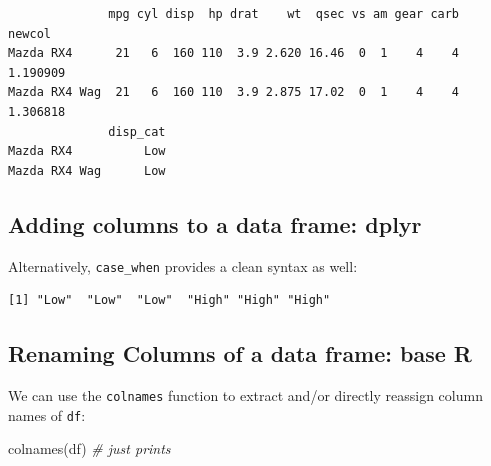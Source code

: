 \documentclass[
]{article}
\newenvironment{Shaded}{\begin{snugshade}}{\end{snugshade}}
\newcommand{\AttributeTok}[1]{\textcolor[rgb]{0.77,0.63,0.00}{#1}}
\newcommand{\CommentTok}[1]{\textcolor[rgb]{0.56,0.35,0.01}{\textit{#1}}}
\newcommand{\DecValTok}[1]{\textcolor[rgb]{0.00,0.00,0.81}{#1}}
\newcommand{\FunctionTok}[1]{\textcolor[rgb]{0.00,0.00,0.00}{#1}}
\newcommand{\NormalTok}[1]{#1}
\newcommand{\OtherTok}[1]{\textcolor[rgb]{0.56,0.35,0.01}{#1}}
\newcommand{\SpecialCharTok}[1]{\textcolor[rgb]{0.00,0.00,0.00}{#1}}
\newcommand{\StringTok}[1]{\textcolor[rgb]{0.31,0.60,0.02}{#1}}
\begin{document}
\begin{verbatim}
              mpg cyl disp  hp drat    wt  qsec vs am gear carb   newcol
Mazda RX4      21   6  160 110  3.9 2.620 16.46  0  1    4    4 1.190909
Mazda RX4 Wag  21   6  160 110  3.9 2.875 17.02  0  1    4    4 1.306818
              disp_cat
Mazda RX4          Low
Mazda RX4 Wag      Low
\end{verbatim}

\hypertarget{adding-columns-to-a-data-frame-dplyr-1}{%
\subsection{Adding columns to a data frame:
dplyr}\label{adding-columns-to-a-data-frame-dplyr-1}}

Alternatively, \texttt{case\_when} provides a clean syntax as well:

\begin{Shaded}
\end{Shaded}

\begin{verbatim}
[1] "Low"  "Low"  "Low"  "High" "High" "High"
\end{verbatim}

\hypertarget{renaming-columns-of-a-data-frame-base-r}{%
\subsection{Renaming Columns of a data frame: base
R}\label{renaming-columns-of-a-data-frame-base-r}}

We can use the \texttt{colnames} function to extract and/or directly
reassign column names of \texttt{df}:

\begin{Shaded}
\begin{Highlighting}[]
\FunctionTok{colnames}\NormalTok{(df) }\CommentTok{\# just prints}
\end{Highlighting}
\end{Shaded}
\end{document}
